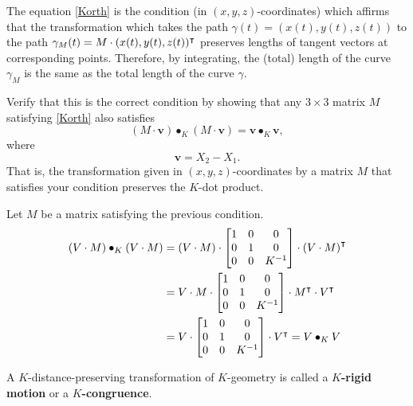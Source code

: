 \documentclass[newpage,hints,handout]{ximera}
\begin{document}
The equation \eqref{Korth} is the condition (in $(x,y,z)$-coordinates) which
affirms that the transformation which takes the path $\gamma(t)=(x(t),y(t),z(t))$
to the path $\gamma_M(t)=M \cdot (x(t),y(t),z(t))^\intercal$ preserves lengths of
tangent vectors at corresponding points. Therefore, by integrating, the
(total) length of the curve $\gamma_M$ is the same as the total length of the
curve $\gamma$.

\begin{problem}
Verify that this is the correct condition by showing that any $3\times3$ matrix
$M$ satisfying \eqref{Korth} also satisfies%
\[
(M \cdot \mathbf v) \bullet_{K} (M \cdot \mathbf v)=
\mathbf v \bullet_K \mathbf v,
\]
where%
\[
\mathbf v=X_{2}-X_{1}.
\]
That is, the transformation given in $(x,y,z)$-coordinates by a matrix $M$ that
satisfies your condition preserves the $K$-dot product.

\begin{freeResponse} 
Let $M$ be a matrix satisfying the previous condition. 
\begin{align*}
\left(   V  \cdot M\right)  \bullet_{K}\left(   V
\cdot M\right)  
&= \left(   V  \cdot M\right) \cdot
 \begin{bmatrix}
1 & 0 & 0\\
0 & 1 & 0\\
0 & 0 & K^{-1}
\end{bmatrix} \cdot \left(   V
\cdot M\right)^\intercal \\
&= V  \cdot M \cdot 
 \begin{bmatrix}
1 & 0 & 0\\
0 & 1 & 0\\
0 & 0 & K^{-1}
\end{bmatrix} \cdot M^\intercal \cdot V^\intercal \\
&= V \cdot \begin{bmatrix}
1 & 0 & 0\\
0 & 1 & 0\\
0 & 0 & K^{-1}
\end{bmatrix} \cdot V^\intercal = V\bullet_{K}V
\end{align*}
\end{freeResponse}

\end{problem}





\begin{definition}
A $K$-distance-preserving transformation of $K$-geometry is called a
$K$\textbf{-rigid motion} or a $K$\textbf{-congruence}.
\end{definition}
\end{document}
